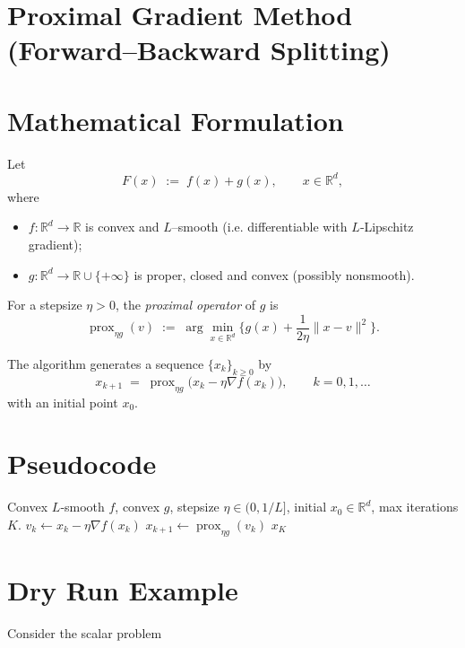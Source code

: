 \documentclass{article}
\newcommand{\prox}{\operatorname{prox}}
\newcommand{\R}{\mathbb{R}}
\begin{document}
\section*{Proximal Gradient Method (Forward–Backward Splitting)}

\section*{Mathematical Formulation}
Let  
\[
F(x)\;:=\;f(x)+g(x),\qquad x\in\R^{d},
\]
where  

\begin{itemize}[nosep]
  \item $f:\R^{d}\rightarrow\R$ is convex and $L$–smooth (i.e. differentiable with $L$‑Lipschitz gradient);
  \item $g:\R^{d}\rightarrow\R\cup\{+\infty\}$ is proper, closed and convex (possibly nonsmooth).
\end{itemize}

For a stepsize $\eta>0$, the \emph{proximal operator} of $g$ is  
\[
\prox_{\eta g}(v)\;:=\;\arg\min_{x\in\R^{d}}\Big\{ g(x)+\frac{1}{2\eta}\|x-v\|^{2}\Big\}.
\]

The algorithm generates a sequence $\{x_{k}\}_{k\ge 0}$ by  
\begin{equation}\label{eq:update}
x_{k+1}\;=\;\prox_{\eta g}\!\bigl(x_{k}-\eta\nabla f(x_{k})\bigr),\qquad k=0,1,\dots
\end{equation}
with an initial point $x_{0}$.

\section*{Pseudocode}
\begin{algorithm}[H]
\caption{Proximal Gradient Method}
\begin{algorithmic}[1]
\Require Convex $L$‑smooth $f$, convex $g$, stepsize $\eta\in(0,1/L]$, initial $x_{0}\in\R^{d}$, max iterations $K$.
    \State $v_{k}\gets x_{k}-\eta\nabla f(x_{k})$ \hfill{}
    \State $x_{k+1}\gets \prox_{\eta g}(v_{k})$ \hfill{}
\EndFor
\State \Return $x_{K}$
\end{algorithmic}
\end{algorithm}

\section*{Dry Run Example}
Consider the scalar problem  
\end{document}
